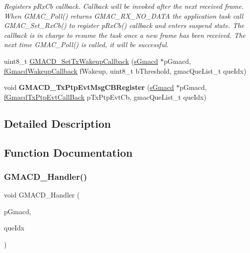 \begin{DoxyCompactItemize}
\begin{DoxyCompactList}\small\item\em Registers p\+Rx\+Cb callback. Callback will be invoked after the next received frame. When G\+M\+A\+C\+\_\+\+Poll() returns G\+M\+A\+C\+\_\+\+R\+X\+\_\+\+N\+O\+\_\+\+D\+A\+TA the application task call G\+M\+A\+C\+\_\+\+Set\+\_\+\+Rx\+Cb() to register p\+Rx\+Cb() callback and enters suspend state. The callback is in charge to resume the task once a new frame has been received. The next time G\+M\+A\+C\+\_\+\+Poll() is called, it will be successful. \end{DoxyCompactList}\item 
uint8\+\_\+t \mbox{\hyperlink{group__gmacd__functions_ga0806a8a23ffb3180d3404ec6d7fbfa1d}{G\+M\+A\+C\+D\+\_\+\+Set\+Tx\+Wakeup\+Callback}} (\mbox{\hyperlink{group__gmacd__types_gaa8760917079000a5ee7fbc7fab992dd3}{s\+Gmacd}} $\ast$p\+Gmacd, \mbox{\hyperlink{group__gmacd__types_ga44e6be4bb53db0660baf6cb50b20a684}{f\+Gmacd\+Wakeup\+Callback}} f\+Wakeup, uint8\+\_\+t b\+Threshold, gmac\+Que\+List\+\_\+t que\+Idx)
\item 
\mbox{\label{group__gmacd__functions_ga14397a277fce1b135fe1b2fc486c224f}} 
void {\bfseries G\+M\+A\+C\+D\+\_\+\+Tx\+Ptp\+Evt\+Msg\+C\+B\+Register} (\mbox{\hyperlink{group__gmacd__types_gaa8760917079000a5ee7fbc7fab992dd3}{s\+Gmacd}} $\ast$p\+Gmacd, \mbox{\hyperlink{group__gmacd__types_gad3329dfe65f5877f50ee8a4fd8e63f08}{f\+Gmacd\+Tx\+Ptp\+Evt\+Call\+Back}} p\+Tx\+Ptp\+Evt\+Cb, gmac\+Que\+List\+\_\+t que\+Idx)
\end{DoxyCompactItemize}


\subsection{Detailed Description}


\subsection{Function Documentation}
\mbox{\label{group__gmacd__functions_ga782194c9b7163c22016beabc6101856c}} 
\subsubsection{\texorpdfstring{GMACD\_Handler()}{GMACD\_Handler()}}
{\footnotesize\ttfamily void G\+M\+A\+C\+D\+\_\+\+Handler (\begin{DoxyParamCaption}\item[{\mbox{\hyperlink{group__gmacd__types_gaa8760917079000a5ee7fbc7fab992dd3}{s\+Gmacd}} $\ast$}]{p\+Gmacd,  }\item[{gmac\+Que\+List\+\_\+t}]{que\+Idx }\end{DoxyParamCaption})}



